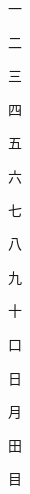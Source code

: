 \begin{spacing}{2.5}
{\Huge \begin{CJK}{UTF8}{min} 一\end{CJK}}\hspace{0.1cm}
{\Huge \begin{CJK}{UTF8}{min} 二\end{CJK}}\hspace{0.1cm}
{\Huge \begin{CJK}{UTF8}{min} 三\end{CJK}}\hspace{0.1cm}
{\Huge \begin{CJK}{UTF8}{min} 四\end{CJK}}\hspace{0.1cm}
{\Huge \begin{CJK}{UTF8}{min} 五\end{CJK}}\hspace{0.1cm}
{\Huge \begin{CJK}{UTF8}{min} 六\end{CJK}}\hspace{0.1cm}
{\Huge \begin{CJK}{UTF8}{min} 七\end{CJK}}\hspace{0.1cm}
{\Huge \begin{CJK}{UTF8}{min} 八\end{CJK}}\hspace{0.1cm}
{\Huge \begin{CJK}{UTF8}{min} 九\end{CJK}}\hspace{0.1cm}
{\Huge \begin{CJK}{UTF8}{min} 十\end{CJK}}\hspace{0.1cm}
{\Huge \begin{CJK}{UTF8}{min} 口\end{CJK}}\hspace{0.1cm}
{\Huge \begin{CJK}{UTF8}{min} 日\end{CJK}}\hspace{0.1cm}
{\Huge \begin{CJK}{UTF8}{min} 月\end{CJK}}\hspace{0.1cm}
{\Huge \begin{CJK}{UTF8}{min} 田\end{CJK}}\hspace{0.1cm}
{\Huge \begin{CJK}{UTF8}{min} 目\end{CJK}}\hspace{0.1cm}

\end{spacing}
